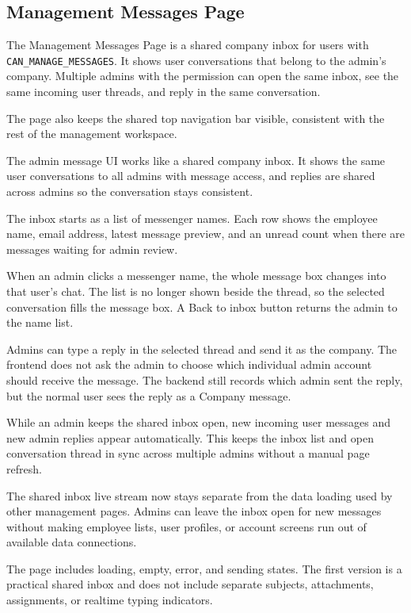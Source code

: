 \documentclass[11pt]{article}
\newcommand{\code}[1]{\nolinkurl{#1}}
\begin{document}
\subsection{Management Messages Page}

The Management Messages Page is a shared company inbox for users with \code{CAN_MANAGE_MESSAGES}. It shows user conversations that belong to the admin's company. Multiple admins with the permission can open the same inbox, see the same incoming user threads, and reply in the same conversation.

The page also keeps the shared top navigation bar visible, consistent with the rest of the management workspace.

The admin message UI works like a shared company inbox. It shows the same user conversations to all admins with message access, and replies are shared across admins so the conversation stays consistent.

The inbox starts as a list of messenger names. Each row shows the employee name, email address, latest message preview, and an unread count when there are messages waiting for admin review.

When an admin clicks a messenger name, the whole message box changes into that user's chat. The list is no longer shown beside the thread, so the selected conversation fills the message box. A Back to inbox button returns the admin to the name list.

Admins can type a reply in the selected thread and send it as the company. The frontend does not ask the admin to choose which individual admin account should receive the message. The backend still records which admin sent the reply, but the normal user sees the reply as a Company message.

While an admin keeps the shared inbox open, new incoming user messages and new admin replies appear automatically. This keeps the inbox list and open conversation thread in sync across multiple admins without a manual page refresh.

The shared inbox live stream now stays separate from the data loading used by other management pages. Admins can leave the inbox open for new messages without making employee lists, user profiles, or account screens run out of available data connections.

The page includes loading, empty, error, and sending states. The first version is a practical shared inbox and does not include separate subjects, attachments, assignments, or realtime typing indicators.
\end{document}
